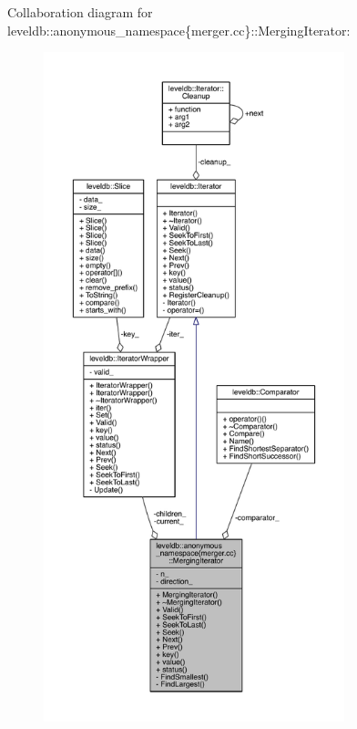 Collaboration diagram for leveldb\+:\+:anonymous\+\_\+namespace\{merger.\+cc\}\+:\+:Merging\+Iterator\+:
\nopagebreak
\begin{figure}[H]
\begin{center}
\leavevmode
\includegraphics[height=550pt]{classleveldb_1_1anonymous__namespace_02merger_8cc_03_1_1_merging_iterator__coll__graph}
\end{center}
\end{figure}
